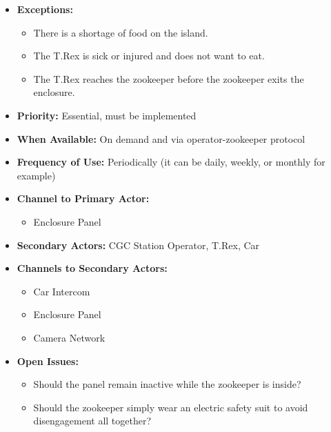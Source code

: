 \documentclass[12pt]{article}
\begin{document}
\begin{itemize}
        \item[]\textbf{Exceptions:}
            \begin{itemize}
                \item[] There is a shortage of food on the island.
                \item[] The T.Rex is sick or injured and does not want to eat.
                \item[] The T.Rex reaches the zookeeper before the zookeeper exits the enclosure.
            \end{itemize}

        \item[]\textbf{Priority:}
            Essential, must be implemented

        \item[]\textbf{When Available:}
            On demand and via operator-zookeeper protocol

        \item[]\textbf{Frequency of Use:}
            Periodically (it can be daily, weekly, or monthly for example)

        \item[]\textbf{Channel to Primary Actor:}
            \begin{itemize}
                \item[] Enclosure Panel
            \end{itemize}

        \item[]\textbf{Secondary Actors:}
            CGC Station Operator, T.Rex, Car
        
        \item[]\textbf{Channels to Secondary Actors:}
            \begin{itemize}
                \item[] Car Intercom
                \item[] Enclosure Panel
                \item[] Camera Network
            \end{itemize}

        \item[]\textbf{Open Issues:}
            \begin{itemize}
                \item[] Should the panel remain inactive while 
                the zookeeper is inside?
                \item[] Should the zookeeper simply wear an electric 
                safety suit to avoid disengagement all together?
            \end{itemize}
    \end{itemize}
    
\end{document}
